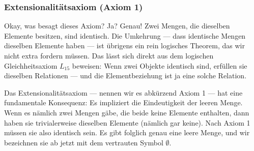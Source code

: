 \subsubsection{Extensionalitätsaxiom (Axiom 1)}
\begin{math-stroke}
\begin{axiom}[Extensionalitätsaxiom]\label[axiom]{ax:extensionalitaet}
\[ \forall x \forall y \, \bigl( \forall z \, (z \in x \leftrightarrow z \in y) \rightarrow x = y \bigr) \]
\end{axiom}
\end{math-stroke}

\begin{ai-global-state-checkpoint-invisible-content}
\end{ai-global-state-checkpoint-invisible-content}

\begin{spoken-clean}[01:22:20 - 01:24:10]
Okay, was besagt dieses Axiom? Ja?
Genau! Zwei Mengen, die dieselben Elemente besitzen, sind identisch. Die Umkehrung --- dass identische Mengen dieselben Elemente haben --- ist übrigens ein rein logisches Theorem, das wir nicht extra fordern müssen. Das lässt sich direkt aus dem logischen Gleichheitsaxiom $L_{15}$ beweisen: Wenn zwei Objekte identisch sind, erfüllen sie dieselben Relationen --- und die Elementbeziehung ist ja eine solche Relation.

Das Extensionalitätsaxiom --- nennen wir es abkürzend Axiom 1 --- hat eine fundamentale Konsequenz: Es impliziert die Eindeutigkeit der leeren Menge. Wenn es nämlich zwei Mengen gäbe, die beide keine Elemente enthalten, dann haben sie trivialerweise dieselben Elemente (nämlich gar keine). Nach Axiom 1 müssen sie also identisch sein. Es gibt folglich genau eine leere Menge, und wir bezeichnen sie ab jetzt mit dem vertrauten Symbol $\emptyset$.
\end{spoken-clean}


